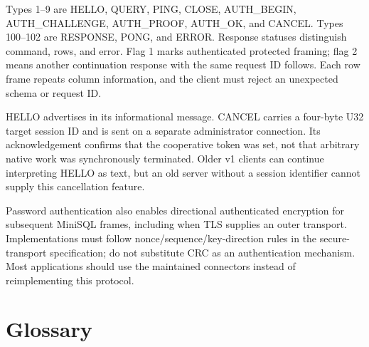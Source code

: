 Types 1--9 are HELLO, QUERY, PING, CLOSE, AUTH\_BEGIN, AUTH\_CHALLENGE, AUTH\_PROOF, AUTH\_OK, and CANCEL. Types 100--102 are RESPONSE, PONG, and ERROR. Response statuses distinguish command, rows, and error. Flag 1 marks authenticated protected framing; flag 2 means another continuation response with the same request ID follows. Each row frame repeats column information, and the client must reject an unexpected schema or request ID.

HELLO advertises  in its informational message. CANCEL carries a four-byte U32 target session ID and is sent on a separate administrator connection. Its acknowledgement confirms that the cooperative token was set, not that arbitrary native work was synchronously terminated. Older v1 clients can continue interpreting HELLO as text, but an old server without a session identifier cannot supply this cancellation feature.

Password authentication also enables directional authenticated encryption for subsequent MiniSQL frames, including when TLS supplies an outer transport. Implementations must follow nonce/sequence/key-direction rules in the secure-transport specification; do not substitute CRC as an authentication mechanism. Most applications should use the maintained connectors instead of reimplementing this protocol.


\section{Glossary}

